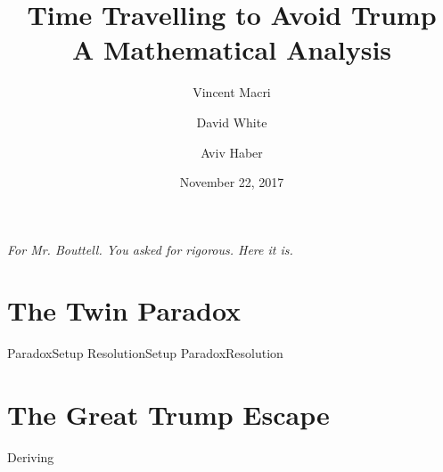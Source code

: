 \documentclass[letterpaper,12pt]{report}
\title{\Huge Time Travelling to Avoid Trump\\\LARGE A Mathematical Analysis}
\author{Vincent Macri \and David White \and Aviv Haber}
\date{November 22, 2017}
\begin{document}
	\maketitle
	\vspace*{\fill}
		\begin{center}
			\large
			\textit{For Mr. Bouttell. You asked for rigorous. Here it is.}
		\end{center}
	\vspace*{\fill}
	\clearpage
	
	\tableofcontents
	\clearpage
	\part{The Twin Paradox}\label{part:twinParadox}
		{ParadoxSetup}
		{ResolutionSetup}
		{ParadoxResolution}
	\part{The Great Trump Escape}\label{part:trumpEscape}
		{Deriving}
	\nocite{*}
	\printbibliography
\end{document}
